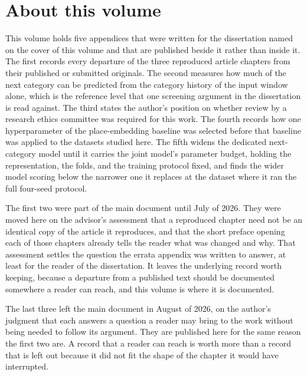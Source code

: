\documentclass[
    12pt,
    openright,
    oneside,
    a4paper,
    sumario=tradicional,
    brazil,
    english,
]{abntex2}
\renewcommand{\contentsname}{Contents}
\begin{document}
    \frenchspacing
    \OnehalfSpacing

    \pretextual
    {
        \singlespacing
        \imprimirfolhaderosto
        \clearpage
    }

    \pdfbookmark[0]{\contentsname}{toc}
    \tableofcontents*
    \cleardoublepage

    \textual


    \chapter*{About this volume}
    \hypertarget{ext:dissertation}{}

    This volume holds five appendices that were
    written for the dissertation named on the
    cover of this volume and that are published beside it rather than inside it. The first
    records every departure of the three reproduced article chapters from their published or
    submitted originals. The second measures how much of the next category can be predicted from
    the category history of the input window alone, which is the reference level that one screening
    argument in the dissertation is read against. The third states the author's position on
    whether review by a research ethics committee was required for this work. The fourth records how
    one hyperparameter of the place-embedding baseline was selected before that baseline was applied
    to the datasets studied here. The fifth widens the dedicated next-category model until it carries
    the joint model's parameter budget, holding the representation, the folds, and the training
    protocol fixed, and finds the wider model scoring below the narrower one it replaces at the
    dataset where it ran the full four-seed protocol.

    The first two were part of the main document until July of 2026. They were moved here on the
    advisor's assessment that a reproduced chapter need not be an identical copy of the article
    it reproduces, and that the short preface opening each of those chapters already tells the
    reader what was changed and why. That assessment settles the question the errata appendix
    was written to answer, at least for the reader of the dissertation. It leaves the underlying
    record worth keeping, because a departure from a published text should be documented
    somewhere a reader can reach, and this volume is where it is documented.

    The last three left the main document in August of 2026, on the author's judgment that each
    answers a question a reader may bring to the work without being needed to follow its argument.
    They are published here for the same reason the first two are. A record that a reader can reach
    is worth more than a record that is left out because it did not fit the shape of the chapter it
    would have interrupted.
\end{document}
